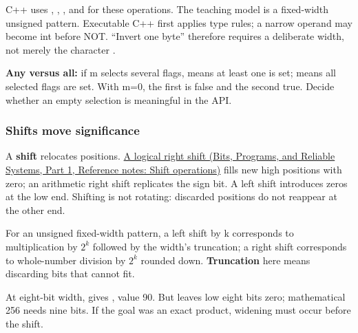 C++ uses \BookInlineCode{{\&}}{\&}, \BookInlineCode{{\textbar{}}}{\textbar{}}, \BookInlineCode{{\^{}}}{\^{}}, and \BookInlineCode{{\textasciitilde{}}}{\textasciitilde{}} for these operations. The teaching model is a fixed-width unsigned pattern. Executable C++ first applies type rules; a narrow operand may become int before NOT. ``Invert one byte'' therefore requires a deliberate width, not merely the character \BookInlineCode{{\textasciitilde{}}}{\textasciitilde{}}.

\textbf{Any versus all:} if m selects several flags,  means at least one is set;  means all selected flags are set. With m=0, the first is false and the second true. Decide whether an empty selection is meaningful in the API.

\subsubsection{Shifts move significance}\label{05-engine-i-ch001-shifts-move-significance}

\hypertarget{05-engine-i-ch001-shifts-move-significance}{}

A \textbf{shift} relocates positions. \href{../01-Bits-Programs-and-Reliable-Systems-P01/main.pdf\#appendix-73425b25118e}{A logical right shift (Bits, Programs, and Reliable Systems, Part 1, Reference notes: Shift operations)} fills new high positions with zero; an arithmetic right shift replicates the sign bit. A left shift introduces zeros at the low end. Shifting is not rotating: discarded positions do not reappear at the other end.

For an unsigned fixed-width pattern, a left shift by k corresponds to multiplication by \(2^k\) followed by the width's truncation; a right shift corresponds to whole-number division by \(2^k\) rounded down. \textbf{Truncation} here means discarding bits that cannot fit.

At eight-bit width,  gives , value 90. But  leaves low eight bits zero; mathematical 256 needs nine bits. If the goal was an exact product, widening must occur before the shift.

